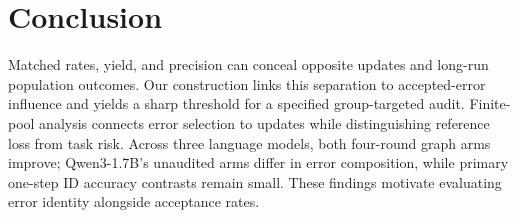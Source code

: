 \par\noindent\begin{minipage}{\linewidth}
\section{Conclusion}
\label{sec:conclusion}

Matched rates, yield, and precision can conceal opposite updates
and long-run population outcomes. Our construction links this separation
to accepted-error influence and yields a sharp threshold for a specified
group-targeted audit. Finite-pool analysis connects error selection to
updates while distinguishing reference loss from task risk.
Across three language models, both four-round graph arms improve; Qwen3-1.7B's
unaudited arms differ in error composition, while primary one-step ID
accuracy contrasts remain small. These findings motivate evaluating
error identity alongside acceptance rates.
\end{minipage}
